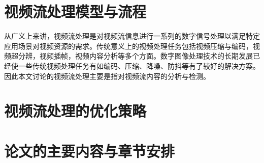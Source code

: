 \section{视频流处理模型与流程}
从广义上来讲，视频流处理是对视频流信息进行一系列的数字信号处理以满足特定应用场景对视频资源的需求。传统意义上的视频处理任务包括视频压缩与编码，视频超分辨，视频插帧，视频内容分析等多个方面。数字图像处理技术的长期发展已经使一些传统视频处理任务有如编码、压缩、降噪、防抖等有了较好的解决方案。因此本文讨论的视频流处理主要是指对视频流内容的分析与检测。

\section{视频流处理的优化策略}

\section{论文的主要内容与章节安排}





